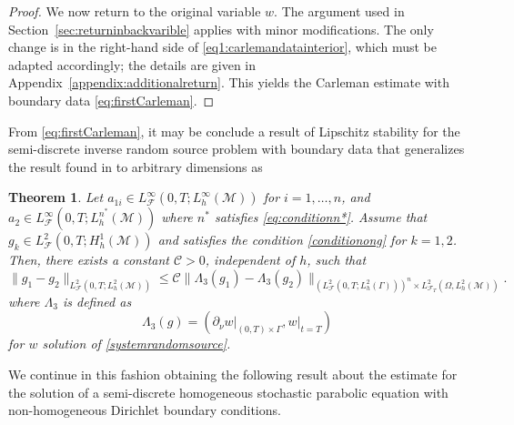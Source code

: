 \documentclass[11pt,oneside,leqno]{amsart}
\numberwithin{equation}{section}
\numberwithin{equation}{section}
\newtheorem{theorem}{Theorem}[section]
\begin{document}
{\begin{proof}
We now return to the original variable $w$. The argument used in Section~\ref{sec:returninbackvarible} applies with minor modifications. The only change is in the right-hand side of \eqref{eq1:carlemandatainterior}, which must be adapted accordingly; the details are given in Appendix~\ref{appendix:additionalreturn}. This yields the Carleman estimate with boundary data \eqref{eq:firstCarleman}.
\end{proof}


From \eqref{eq:firstCarleman}, it may be conclude a result of Lipschitz stability for the semi-discrete inverse random source problem with boundary data that generalizes the result found in \cite{WWW:2024} to arbitrary dimensions as
\begin{theorem}
Let $a_{1i}\in L^\infty_{\mathcal{F}}(0,T;L_h^\infty(\mathcal{M}))$ for $i=1,\ldots,n$, and $a_2\in L_{\mathcal{F}}^{\infty}(0,T;L_h^{n^{\ast}}(\mathcal{M}))$ where $n^{\ast}$ satisfies \eqref{eq:conditionn*}. Assume that $g_k \in L^2_{\mathcal{F}}(0,T;H_h^1(\mathcal{M}))$ and satisfies the condition \eqref{conditionong} for $k=1,2$. Then, there exists a constant $\mathcal{C} > 0$, independent of $h$, such that
\begin{equation}
\|g_1 - g_2\|_{L^2_{\mathcal{F}}(0,T;L_h^2(\mathcal{M}))} \leq \mathcal{C} \|\Lambda_3(g_1) - \Lambda_3(g_2)\|_{(L^2_{\mathcal{F}}(0,T;L^2_{h}(\Gamma)))^n\times L^2_{\mathcal{F}_T}(\Omega,L^2_{h}(\mathcal{M}))}.
\end{equation}
where $\Lambda_{3}$ is defined as
\[
\Lambda_{3}(g)=(\left.\partial_{\nu}w\right|_{(0,T)\times\Gamma},\left.w\right|_{t=T})
\]
for $w$ solution of \eqref{systemrandomsource}.
\end{theorem}

We continue in this fashion obtaining the following result about the estimate for the solution of a semi-discrete homogeneous stochastic parabolic equation with non-homogeneous Dirichlet boundary conditions.
}
\end{document}
